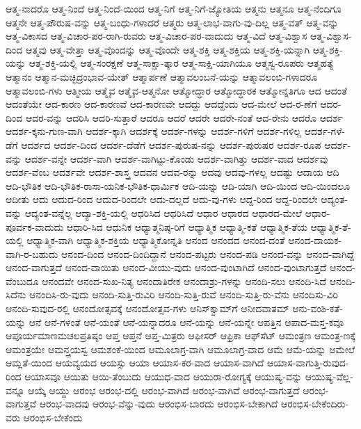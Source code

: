 {ಆತ್ಮ-ನಾದರೊ
ಆತ್ಮ-ನಿಂದೆ
ಆತ್ಮ-ನಿಂದೆ-ಯಿಂದ
ಆತ್ಮ-ನಿಗೆ
ಆತ್ಮ-ನಿಗೆ-ಜ್ಯೋತಿಯ
ಆತ್ಮನು
ಆತ್ಮನೂ
ಆತ್ಮ-ನೆಂದಿಗೂ
ಆತ್ಮನೇ
ಆತ್ಮ-ಪೌರುಷ-ವನ್ನು
ಆತ್ಮ-ಬಂಧು-ಗಳಾದರೆ
ಆತ್ಮರು
ಆತ್ಮ-ಲಾಭ-ವಾಗು-ವು-ದಿಲ್ಲ
ಆತ್ಮ-ವತ್
ಆತ್ಮ-ವನ್ನು
ಆತ್ಮ-ವಿಕಾಸದ
ಆತ್ಮ-ವಿಚಾರ-ಪರ-ರಾಗಿ-ರುವರು
ಆತ್ಮ-ವಿಚಾರ-ಪರ-ವಾದುದು
ಆತ್ಮ-ವಿದೆ
ಆತ್ಮ-ವಿಶ್ವಾಸ
ಆತ್ಮ-ವಿಶ್ವಾಸ-ದಿಂದ
ಆತ್ಮವು
ಆತ್ಮ-ವೇತ್ತಾ
ಆತ್ಮ-ವೊಂದನ್ನು
ಆತ್ಮ-ವೊಂದೇ
ಆತ್ಮ-ಶಕ್ತಿ
ಆತ್ಮ-ಶಕ್ತಿಯ
ಆತ್ಮ-ಶಕ್ತಿ-ಯನ್ನಾಗಿ
ಆತ್ಮ-ಶಕ್ತಿ-ಯನ್ನು
ಆತ್ಮ-ಶಕ್ತಿ-ಯಲ್ಲಿ
ಆತ್ಮ-ಸಂರಕ್ಷಣೆ
ಆತ್ಮ-ಸಾಕ್ಷಾ-ತ್ಕಾರ
ಆತ್ಮ-ಸಾಕ್ಷಿ-ಯಾಗಿಯೂ
ಆತ್ಮಸ್ವ-ರೂಪರು
ಆತ್ಮಹತ್ಯೆ
ಆತ್ಮಾನಂ
ಆತ್ಮಾನ-ಮಚ್ಛಿದ್ರಂಭಾವ-ಯೇತ್
ಆತ್ಮಾರ್ಪಣೆ
ಆತ್ಮಾವಲಂಬನೆ-ಯನ್ನು
ಆತ್ಮಾವಲಂಬಿ-ಗಳಾದರೂ
ಆತ್ಮಾವಲಂಬಿ-ಗಳು
ಆತ್ಮೀಯ
ಆತ್ಮೈವ
ಆತ್ಮೈವ-ಆತ್ಮನೋ
ಆತ್ಮೋದ್ಧಾರ
ಆತ್ಮೋದ್ಧಾರಕ
ಆತ್ಮೋನ್ನತಿಗೂ
ಆದ
ಆದಂತೆ
ಆದಂತೆಯೇ
ಆದ-ಕಾರಣ
ಆದ-ಕಾರಣವೆ
ಆದ-ಕಾರಣವೇ
ಆದದ್ದು
ಆದದ್ದೆಂದು
ಆದ-ಮೇಲೆ
ಆದ-ರ-ಣೆಗೆ
ಆದರ-ದಿಂದ
ಆದರ-ವನ್ನು
ಆದರಿಸಿ
ಆದರಿ-ಸುತ್ತಾರೆ
ಆದರೂ
ಆದರೆ
ಆದರೇ
ಆದರೇ-ನಂತೆ
ಆದ-ರೇನು
ಆದರೊ
ಆದರ್ಶ
ಆದರ್ಶ-ಕ್ಕನು-ಗುಣ-ವಾಗಿ
ಆದರ್ಶ-ಕ್ಕಾಗಿ
ಆದರ್ಶಕ್ಕೆ
ಆದರ್ಶ-ಗಳನ್ನು
ಆದರ್ಶ-ಗಳಿಗೆ
ಆದರ್ಶ-ಗಳಿಲ್ಲ
ಆದರ್ಶ-ಗಳೆ-ಡೆಗೆ
ಆದರ್ಶದ
ಆದರ್ಶ-ದಿಂದ
ಆದರ್ಶ-ದೆಡೆಗೆ
ಆದರ್ಶ-ಪುರುಷ-ನನ್ನು
ಆದರ್ಶ-ಪುರುಷರ
ಆದರ್ಶ-ರೂಪ
ಆದರ್ಶ-ವನ್ನು
ಆದರ್ಶ-ವನ್ನೇ
ಆದರ್ಶ-ವಾಗಿ
ಆದರ್ಶ-ವಾಗಿಟ್ಟು-ಕೊಂಡು
ಆದರ್ಶ-ವಾಗಿತ್ತು
ಆದರ್ಶ-ವಾದ
ಆದರ್ಶವು
ಆದರ್ಶ-ವೆಂಬ
ಆದರ್ಶವೇ
ಆದರ್ಶ-ಶಾಸ್ತ್ರ
ಆದವನ
ಆದವ-ರನ್ನು
ಆದವು
ಆದವು-ಗಳಲ್ಲ
ಆದಷ್ಟು
ಆದಾಯ
ಆದಿ
ಆದಿ-ಭೌತಿಕ
ಆದಿ-ಭೌತಿಕ-ರಾಸಾ-ಯನಿಕ-ಭೌತಿಕ-ಧಾರ್ಮಿಕ
ಆದಿ-ಯನ್ನು
ಆದಿ-ಯಾಗಿ
ಆದಿ-ಯಿಂದ
ಆದಿ-ಯಿಂದಲೂ
ಆದೀತು
ಆದು
ಆದುದ-ರಿಂದ
ಆದುದ-ರಿಂದಲೇ
ಆದು-ದಲ್ಲದೆ
ಆದು-ವು-ಗಳು
ಆದ್ದ-ರಿಂದ
ಆದ್ದ-ರಿಂದಲೇ
ಆದ್ಯಂತ-ವನ್ನು
ಆದ್ಯಂತ-ವನ್ನೆಲ್ಲ
ಆದ್ಯಾ-ಶಕ್ತಿ-ಯಲ್ಲಿ
ಆಧರಿಸಿದ
ಆಧರಿಸಿದೆ
ಆಧಾರ
ಆಧಾರದ
ಆಧಾರದ-ಮೇಲೆ
ಆಧಾರ-ಪೂರ್ವಕ-ವಾದುದು
ಆಧಾರಿ-ಸಿದ
ಆಧುನಿಕ
ಆಧ್ಯಾತ್ಮನಿಷ್ಠ-ರಿಗೆ
ಆಧ್ಯಾತ್ಮಿಕ
ಆಧ್ಯಾತ್ಮಿ-ಕತೆ
ಆಧ್ಯಾತ್ಮಿಕ-ತೆಯ
ಆಧ್ಯಾತ್ಮಿಕ-ತೆ-ಯಲ್ಲಿ
ಆಧ್ಯಾತ್ಮಿಕ-ವಾಗಿ
ಆಧ್ಯಾತ್ಮಿಕ-ಶಕ್ತಿಯ
ಆಧ್ಯಾತ್ಮಿಕೋನ್ನತಿ
ಆನಂದ
ಆನಂದದ
ಆನಂದ-ದಂತೆ
ಆನಂದ-ದಾಯಕ-ವಾಗಿ-ರ-ಬಹುದು
ಆನಂದ-ದಿಂದ
ಆನಂದ-ದಿಂದಿದ್ದಾನೆ
ಆನಂದ-ಪಟ್ಟರು
ಆನಂದ-ಪಡಿ
ಆನಂದ-ವನ್ನು
ಆನಂದ-ವಾಗಿದ್ದೆ
ಆನಂದ-ವಾಗುತ್ತದೆ
ಆನಂದ-ವಾಯಿತು
ಆನಂದ-ವೀಯು-ವುದು
ಆನಂದ-ವುಂಟಾಗಿದೆ
ಆನಂದ-ವುಂಟಾಗುತ್ತದೆ
ಆನಂದ-ವೆಂಬುದೂ
ಆನಂದವೇ
ಆನಂದ-ಸುಖ-ನಿತ್ಯ
ಆನಂದಾತಿರೇಕ
ಆನಂದಾಶ್ರು-ಗಳನ್ನು
ಆನಂದಿ-ಸಲು
ಆನಂದಿ-ಸಿದೆ
ಆನಂದಿ-ಸಿದೆನು
ಆನಂದಿಸಿ-ರು-ವುದು
ಆನಂದಿ-ಸುತ್ತಿ-ರುವಿರಿ
ಆನಂದಿ-ಸುತ್ತಿ-ರುವೆ
ಆನಂದಿ-ಸುತ್ತಿ-ರು-ವೆನು
ಆನಂದಿಸು-ವಿರಿ
ಆನಂದಿ-ಸುವುದ-ರಲ್ಲಿ
ಆನಂದೋತ್ಸವಕ್ಕೆ
ಆನಂದೋತ್ಸವ-ಗಳು
ಆನಿಸ್‌ಕ್ವಾಮ್‌ಗೆ
ಆನೀದವಾತಮ್
ಆನು-ವಂಶಿ-ಕತೆ-ಯನ್ನು
ಆನೆ
ಆನೆ-ಗಳಂತೆ
ಆನೆ-ಯಂತೆ
ಆನೆ-ಯನ್ನಾದರೂ
ಆನೆ-ಯನ್ನು
ಆನೆ-ಯನ್ನೇ
ಆಪತ್ತಿನ
ಆಪಾದ-ಮಸ್ತ-ಕವೂ
ಆಪೂರ್ಯಮಾಣಮಚಲಪ್ರತಿಷ್ಠಂ
ಆಪ್ತ
ಆಪ್ತನೆ
ಆಪ್ತ-ಮಿತ್ರರು
ಆಫೀಸರ್
ಆಫ್ರಿಕಾ
ಆಫ್‌ಸೆಟ್
ಆಮಂತ್ರಣ
ಆಮಂತ್ರ-ಣಕ್ಕೆ
ಆಮಂತ್ರಯೇ
ಆಮನ್ತ್ರಯಸ್ವ
ಆಮಶಂಕೆ-ಯಿಂದ
ಆಮೂಲಾಗ್ರ-ವಾಗಿ
ಆಮೂಲಾಗ್ರ-ವಾದ
ಆಮೆ
ಆಮೆ-ಯನ್ನು
ಆಮೇಲೆ
ಆಮ್ಲತೆ-ಯಿಂದ
ಆಯವ್ಯಯದ
ಆಯಸ್ಸು
ಆಯಾ
ಆಯಾಸ-ಕರ-ವಾದ
ಆಯಾಸ-ವಾಗಿದೆ
ಆಯಾಸ-ವಾಗುತ್ತಿ-ರುವುದ-ರಿಂದ
ಆಯಾಸವೂ
ಆಯಿತು
ಆಯಿ-ತೆಂಬುದು
ಆಯುಧ-ವಾದ
ಆಯುರಾ-ರೋಗ್ಯಕ್ಕೆ
ಆಯುಷ್ಯ-ವನ್ನು
ಆಯುಷ್ಯ-ವೆಲ್ಲ-ವನ್ನೂ
ಆಯ್ಕೆ
ಆಯ್ದು
ಆರಂಭ
ಆರಂಭ-ದಲ್ಲಿ
ಆರಂಭ-ವಾಗಿದೆ
ಆರಂಭ-ವಾಗಿವೆ
ಆರಂಭ-ವಾಗುತ್ತದೆ
ಆರಂಭ-ವಾಗುತ್ತವೆ
ಆರಂಭ-ವಾದವು
ಆರಂಭ-ವೆನ್ನು-ವುದು
ಆರಂಭಿಸ-ಬಾರದು
ಆರಂಭಿಸ-ಬೇಕಾಗಿದೆ
ಆರಂಭಿಸ-ಬೇಕೆಂದಿರು-ವರು
ಆರಂಭಿಸ-ಬೇಕೆಂದು
}
